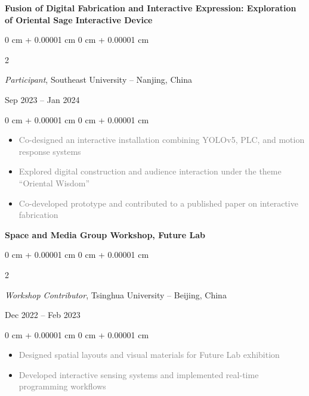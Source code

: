 \documentclass[10pt, letterpaper]{article}
\newenvironment{highlights}{
    \begin{itemize}[
        topsep=0.10 cm,
        parsep=0.10 cm,
        partopsep=0pt,
        itemsep=0pt,
        leftmargin=0 cm + 10pt
    ]
}{
    \end{itemize}
} %
\newenvironment{onecolentry}{
    \begin{adjustwidth}{
        0 cm + 0.00001 cm
    }{
        0 cm + 0.00001 cm
    }
}{
    \end{adjustwidth}
} %
\newenvironment{twocolentry}[2][]{
    \onecolentry
    \def\secondColumn{#2}
    \setcolumnwidth{\fill, 4.5 cm}
    \begin{paracol}{2}
}{
    \switchcolumn \raggedleft \secondColumn
    \end{paracol}
    \endonecolentry
} %
\begin{document}
    \vspace{0.20 cm}

    \textbf{Fusion of Digital Fabrication and Interactive Expression: Exploration of Oriental Sage Interactive Device} \\
    \begin{twocolentry}{
    Sep 2023 – Jan 2024
    }
    \textit{Participant}, Southeast University -- Nanjing, China
    \end{twocolentry}
    
    \vspace{0.10 cm}
    \begin{onecolentry}
    \begin{highlights}
        \item \textcolor{gray}{Co-designed an interactive installation combining YOLOv5, PLC, and motion response systems}
        \item \textcolor{gray}{Explored digital construction and audience interaction under the theme “Oriental Wisdom”}
        \item \textcolor{gray}{Co-developed prototype and contributed to a published paper on interactive fabrication}
    \end{highlights}
    \end{onecolentry}

    \vspace{0.2 cm}
    

    \textbf{Space and Media Group Workshop, Future Lab} \\
    \begin{twocolentry}{
    Dec 2022 – Feb 2023
    }
    \textit{Workshop Contributor}, Tsinghua University -- Beijing, China
    \end{twocolentry}
    
    \vspace{0.10 cm}
    \begin{onecolentry}
    \begin{highlights}
        \item \textcolor{gray}{Designed spatial layouts and visual materials for Future Lab exhibition}
        \item \textcolor{gray}{Developed interactive sensing systems and implemented real-time programming workflows}
    \end{highlights}
    \end{onecolentry}
    
    \vspace{0.2 cm}
\end{document}
